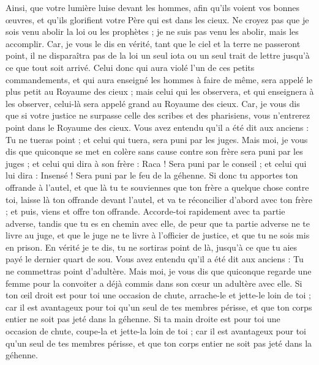 \begin{multicols}{2}
Ainsi, que votre lumière luise devant les hommes, afin qu'ils voient vos bonnes œuvres, et qu'ils glorifient votre Père qui est dans les cieux.
Ne croyez pas que je sois venu abolir la loi ou les prophètes ; je ne suis pas venu les abolir, mais les accomplir.
Car, je vous le dis en vérité, tant que le ciel et la terre ne passeront point, il ne disparaîtra pas de la loi un seul iota ou un seul trait de lettre jusqu'à ce que tout soit arrivé.
Celui donc qui aura violé l'un de ces petits commandements, et qui aura enseigné les hommes à faire de même, sera appelé le plus petit au Royaume des cieux ; mais celui qui les observera, et qui enseignera à les observer, celui-là sera appelé grand au Royaume des cieux.
Car, je vous dis que si votre justice ne surpasse celle des scribes et des pharisiens, vous n'entrerez point dans le Royaume des cieux.
Vous avez entendu qu'il a été dit aux anciens : Tu ne tueras point ; et celui qui tuera, sera puni par les juges.
Mais moi, je vous dis que quiconque se met en colère sans cause contre son frère sera puni par les juges ; et celui qui dira à son frère : Raca ! Sera puni par le conseil ; et celui qui lui dira : Insensé ! Sera puni par le feu de la géhenne.
Si donc tu apportes ton offrande à l'autel, et que là tu te souviennes que ton frère a quelque chose contre toi,
laisse là ton offrande devant l'autel, et va te réconcilier d'abord avec ton frère ; et puis, viens et offre ton offrande.
Accorde-toi rapidement avec ta partie adverse, tandis que tu es en chemin avec elle, de peur que ta partie adverse ne te livre au juge, et que le juge ne te livre à l'officier de justice, et que tu ne sois mis en prison.
En vérité je te dis, tu ne sortiras point de là, jusqu'à ce que tu aies payé le dernier quart de sou.
Vous avez entendu qu'il a été dit aux anciens : Tu ne commettras point d'adultère.
Mais moi, je vous dis que quiconque regarde une femme pour la convoiter a déjà commis dans son cœur un adultère avec elle.
Si ton œil droit est pour toi une occasion de chute, arrache-le et jette-le loin de toi ; car il est avantageux pour toi qu'un seul de tes membres périsse, et que ton corps entier ne soit pas jeté dans la géhenne.
Si ta main droite est pour toi une occasion de chute, coupe-la et jette-la loin de toi ; car il est avantageux pour toi qu'un seul de tes membres périsse, et que ton corps entier ne soit pas jeté dans la géhenne.

\end{multicols}
